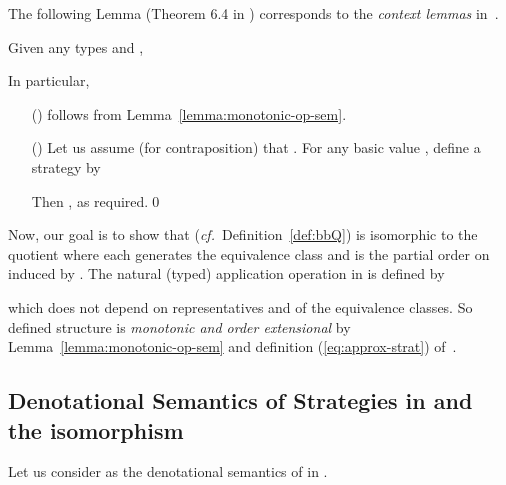 \documentclass[fleqn]{LMCS}
\theoremstyle{plain}\newtheorem{satz}[thm]{Satz}
\theoremstyle{plain}\newtheorem{hyp}[thm]{Hypothesis}
\theoremstyle{plain}\newtheorem{hyps}[thm]{Hypotheses}
\theoremstyle{definition}\newtheorem{note}[thm]{Note}
\def\cf{{\em cf.}}
\newcommand{\?}{\mbox{?}}
\begin{document}
\noindent
The following Lemma 
(Theorem 6.4 in \cite{Saz76SMZH}) 
corresponds to the \emph{context lemmas} in~\cite{Milner77}. 

\begin{lem}\label{lemma:context}
 Given any types  and ,

In particular, 

\end{lem}
\proof\hfill
\begin{itemize}  
\item[()] follows from Lemma~\ref{lemma:monotonic-op-sem}. 

\item[()]
Let us assume (for contraposition) that 
. 
For any basic value , define a strategy  by 

Then , 
as required.\qed
\end{itemize}

\noindent
Now, our goal is to show that 
 (\cf\ Definition~\ref{def:bbQ}) 
is isomorphic to the quotient 
 where each  
generates the equivalence class  and  
is the partial order on  induced by . 
The natural (typed) application operation in
 is defined by 

which does not depend on
representatives  and  of the equivalence classes. 
So defined structure  
is \emph{monotonic and order extensional} by 
Lemma~\ref{lemma:monotonic-op-sem} and definition 
(\ref{eq:approx-strat}) of~.
\nopagebreak
\subsection{Denotational Semantics of Strategies in 
\texorpdfstring{}{tilde-Q} 
and the isomorphism \texorpdfstring{}{of tilde-Q and inductively defined Q}}
\label{sec:den-sem-isomorphism}

Let us consider  as the denotational semantics of  in .
\end{document}
